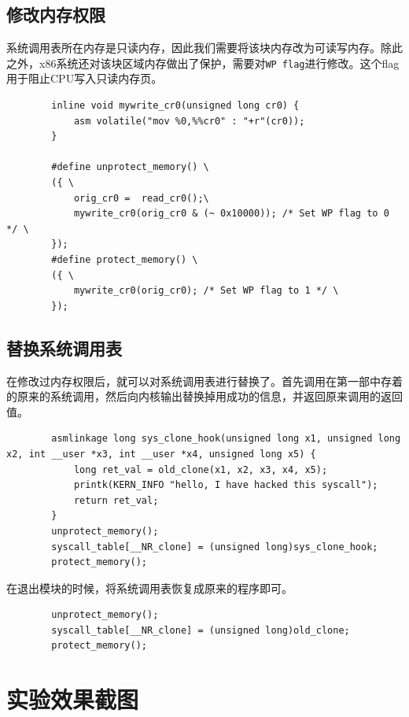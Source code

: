 \documentclass[UTF8]{ctexrep}
\begin{document}
    \subsection{修改内存权限}

    系统调用表所在内存是只读内存，因此我们需要将该块内存改为可读写内存。除此之外，x86系统还对该块区域内存做出了保护，需要对\texttt{WP flag}进行修改。这个flag用于阻止CPU写入只读内存页。

    \begin{lstlisting}
        inline void mywrite_cr0(unsigned long cr0) {
            asm volatile("mov %0,%%cr0" : "+r"(cr0));
        }

        #define unprotect_memory() \
        ({ \
            orig_cr0 =  read_cr0();\
            mywrite_cr0(orig_cr0 & (~ 0x10000)); /* Set WP flag to 0 */ \
        });
        #define protect_memory() \
        ({ \
            mywrite_cr0(orig_cr0); /* Set WP flag to 1 */ \
        });\end{lstlisting}

    \subsection{替换系统调用表}
    在修改过内存权限后，就可以对系统调用表进行替换了。首先调用在第一部中存着的原来的系统调用，然后向内核输出替换掉用成功的信息，并返回原来调用的返回值。
    
    \begin{lstlisting}
        asmlinkage long sys_clone_hook(unsigned long x1, unsigned long x2, int __user *x3, int __user *x4, unsigned long x5) {
            long ret_val = old_clone(x1, x2, x3, x4, x5);
            printk(KERN_INFO "hello, I have hacked this syscall");
            return ret_val;
        }
        unprotect_memory();
        syscall_table[__NR_clone] = (unsigned long)sys_clone_hook;
        protect_memory();\end{lstlisting}

    在退出模块的时候，将系统调用表恢复成原来的程序即可。

    \begin{lstlisting}
        unprotect_memory();
        syscall_table[__NR_clone] = (unsigned long)old_clone;
        protect_memory();\end{lstlisting}

    \section{实验效果截图}
\end{document}
